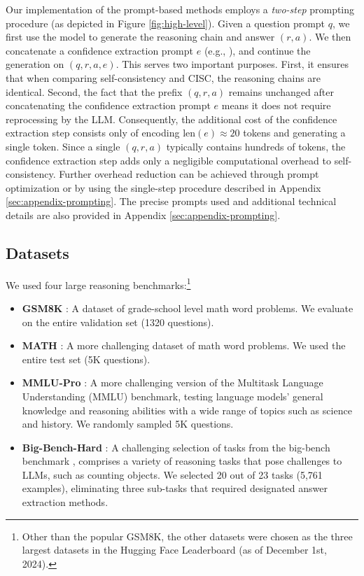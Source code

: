 Our implementation of the prompt-based methods employs a \emph{two-step} prompting procedure (as depicted in Figure \ref{fig:high-level}).
Given a question prompt $q$, we first use the model to generate the reasoning chain and answer $(r,a)$. We then concatenate a confidence extraction prompt $e$ (e.g., ), and continue the generation on $(q,r,a,e)$. This serves two important purposes. First, it ensures that when comparing self-consistency and CISC, the reasoning chains are identical. Second, the fact that the prefix $(q,r,a)$ remains unchanged after concatenating the confidence extraction prompt $e$ means it does not require reprocessing by the LLM. Consequently, the additional cost of the confidence extraction step consists only of encoding $\text{len}(e)\approx 20$ tokens and generating a single token. Since a single $(q,r,a)$ typically contains hundreds of tokens, the confidence extraction step adds only a negligible computational overhead to self-consistency. Further overhead reduction can be achieved through prompt optimization or by using the single-step procedure described in Appendix \ref{sec:appendix-prompting}. The precise prompts used and additional technical details are also provided in Appendix \ref{sec:appendix-prompting}.

\subsection{Datasets}
\label{sec:datasets}

We used four large reasoning benchmarks:\footnote{Other than the popular GSM8K, the other datasets were chosen as the three largest datasets in the Hugging Face Leaderboard \cite{leaderboard} (as of December 1st, 2024).}

\begin{itemize}[itemsep=1pt, topsep=2pt,leftmargin=*]
\item  \textbf{GSM8K} \cite{cobbe2021gsm8k}: A dataset of grade-school level math word problems. We evaluate on the entire validation set (1320 questions). %
\item \textbf{MATH} \cite{hendrycksmath2021}: A more challenging dataset of math word problems. We used the entire test set (5K questions). %
\item \textbf{MMLU-Pro} \cite{wang2024mmlu}: A more challenging version of the Multitask Language Understanding (MMLU)  benchmark, testing language models' general knowledge and reasoning abilities with a wide range of topics such as science and history. We randomly sampled 5K questions.
\item \textbf{Big-Bench-Hard} \cite{suzgun2022challenging}: A challenging selection of tasks from the big-bench benchmark \cite{srivastava2023beyond}, comprises a variety of reasoning tasks that pose challenges to LLMs, such as counting objects. We selected 20 out of 23 tasks (5,761 examples), eliminating three sub-tasks that required designated answer extraction methods.
\end{itemize}

